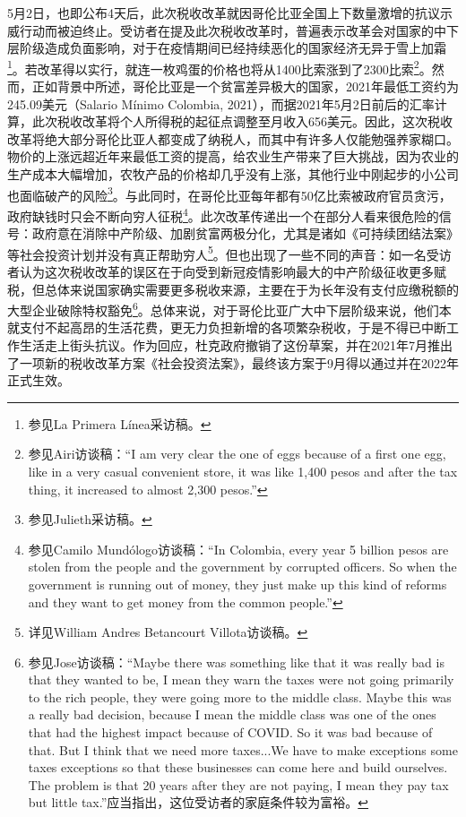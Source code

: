 \documentclass{phyasgn}\usepackage{nag}
\begin{document}
\par 5月2日，也即公布4天后，此次税收改革就因哥伦比亚全国上下数量激增的抗议示威行动而被迫终止。受访者在提及此次税收改革时，普遍表示改革会对国家的中下层阶级造成负面影响，对于在疫情期间已经持续恶化的国家经济无异于雪上加霜\footnote[15]{参见La Primera Línea采访稿。}。若改革得以实行，就连一枚鸡蛋的价格也将从1400比索涨到了2300比索\footnote[16]{参见Airi访谈稿：“I am very clear the one of eggs because of a first one egg, like in a very casual convenient store, it was like 1,400 pesos and after the tax thing, it increased to almost 2,300 pesos.”}。然而，正如背景中所述，哥伦比亚是一个贫富差异极大的国家，2021年最低工资约为245.09美元（Salario Mínimo Colombia, 2021），而据2021年5月2日前后的汇率计算，此次税收改革将个人所得税的起征点调整至月收入656美元。因此，这次税收改革将绝大部分哥伦比亚人都变成了纳税人，而其中有许多人仅能勉强养家糊口。物价的上涨远超近年来最低工资的提高，给农业生产带来了巨大挑战，因为农业的生产成本大幅增加，农牧产品的价格却几乎没有上涨，其他行业中刚起步的小公司也面临破产的风险\footnote[17]{参见Julieth采访稿。}。与此同时，在哥伦比亚每年都有50亿比索被政府官员贪污，政府缺钱时只会不断向穷人征税\footnote[18]{参见Camilo Mundólogo访谈稿：“In Colombia, every year 5 billion pesos are stolen from the people and the government by corrupted officers. So when the government is running out of money, they just make up this kind of reforms and they want to get money from the common people.”}。此次改革传递出一个在部分人看来很危险的信号：政府意在消除中产阶级、加剧贫富两极分化，尤其是诸如《可持续团结法案》等社会投资计划并没有真正帮助穷人\footnote[19]{详见William Andres Betancourt Villota访谈稿。}。但也出现了一些不同的声音：如一名受访者认为这次税收改革的误区在于向受到新冠疫情影响最大的中产阶级征收更多赋税，但总体来说国家确实需要更多税收来源，主要在于为长年没有支付应缴税额的大型企业破除特权豁免\footnote[20]{参见Jose访谈稿：“Maybe there was something like that it was really bad is that they wanted to be, I mean they warn the taxes were not going primarily to the rich people, they were going more to the middle class. Maybe this was a really bad decision, because I mean the middle class was one of the ones that had the highest impact because of COVID. So it was bad because of that. But I think that we need more taxes...We have to make exceptions some taxes exceptions so that these businesses can come here and build ourselves. The problem is that 20 years after they are not paying, I mean they pay tax but little tax.”应当指出，这位受访者的家庭条件较为富裕。}。总体来说，对于哥伦比亚广大中下层阶级来说，他们本就支付不起高昂的生活花费，更无力负担新增的各项繁杂税收，于是不得已中断工作生活走上街头抗议。作为回应，杜克政府撤销了这份草案，并在2021年7月推出了一项新的税收改革方案《社会投资法案》，最终该方案于9月得以通过并在2022年正式生效。
\end{document}

